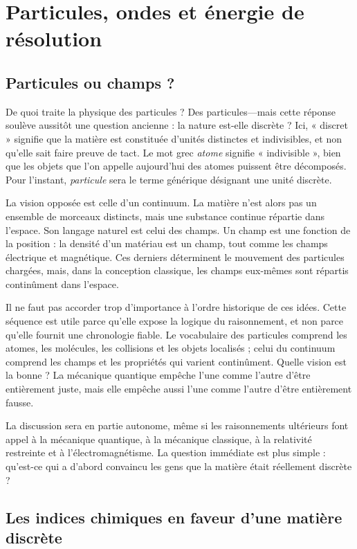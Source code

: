 \chapter{Particules, ondes et énergie de résolution}

\section{Particules ou champs ?}

De quoi traite la physique des particules ? Des particules---mais cette réponse soulève aussitôt une question ancienne : la nature est-elle discrète ? Ici, « discret » signifie que la matière est constituée d’unités distinctes et indivisibles, et non qu’elle sait faire preuve de tact. Le mot grec \emph{atome} signifie « indivisible », bien que les objets que l’on appelle aujourd’hui des atomes puissent être décomposés. Pour l’instant, \emph{particule} sera le terme générique désignant une unité discrète.

La vision opposée est celle d’un continuum. La matière n’est alors pas un ensemble de morceaux distincts, mais une substance continue répartie dans l’espace. Son langage naturel est celui des champs. Un champ est une fonction de la position : la densité d’un matériau est un champ, tout comme les champs électrique et magnétique. Ces derniers déterminent le mouvement des particules chargées, mais, dans la conception classique, les champs eux-mêmes sont répartis continûment dans l’espace.

Il ne faut pas accorder trop d’importance à l’ordre historique de ces idées. Cette séquence est utile parce qu’elle expose la logique du raisonnement, et non parce qu’elle fournit une chronologie fiable. Le vocabulaire des particules comprend les atomes, les molécules, les collisions et les objets localisés ; celui du continuum comprend les champs et les propriétés qui varient continûment. Quelle vision est la bonne ? La mécanique quantique empêche l’une comme l’autre d’être entièrement juste, mais elle empêche aussi l’une comme l’autre d’être entièrement fausse.

La discussion sera en partie autonome, même si les raisonnements ultérieurs font appel à la mécanique quantique, à la mécanique classique, à la relativité restreinte et à l’électromagnétisme. La question immédiate est plus simple : qu’est-ce qui a d’abord convaincu les gens que la matière était réellement discrète ?

\section{Les indices chimiques en faveur d’une matière discrète}

